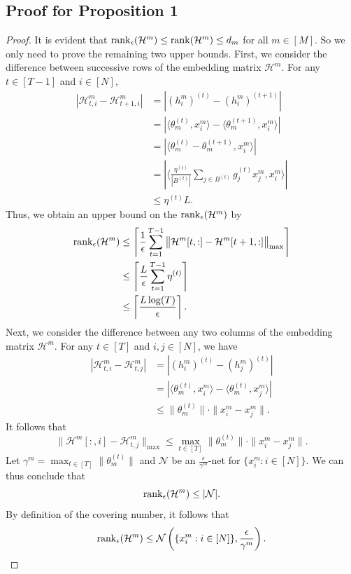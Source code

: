 \subsection{Proof for Proposition 1}
\begin{proof}
    It is evident that $\operatorname{rank}_\epsilon(\mathcal{H}^m) \leq \operatorname{rank}(\mathcal{H}^m) \leq d_m$ for all $m \in [M]$. So we only need to prove the remaining two upper bounds. First, we consider the difference between successive rows of the embedding matrix $\mathcal{H}^m$. For any $t \in [T-1]$ and $i \in [N]$, 
    \begin{align*}
        |\mathcal{H}^m_{t, i} - \mathcal{H}^m_{t+1, i}| &= |(h_i^m)^{(t)} - (h_i^m)^{(t+1)}|
        \\&= |\langle \theta_m^{(t)}, x^m_i\rangle - \langle \theta_m^{(t+1)}, x^m_i\rangle|
        \\&= |\langle \theta_m^{(t)} - \theta_m^{(t+1)}, x^m_i\rangle|
        \\&= \left|\langle \frac{\eta^{(t)}}{|B^{(t)}|}\sum_{j\in B^{(t)}} g_j^{(t)} x_j^m , x^m_i\rangle\right|
        \\&\leq \eta^{(t)}L.
    \end{align*}
    Thus, we obtain an upper bound on the $\operatorname{rank}_\epsilon(\mathcal{H}^m)$ by 
    \begin{align*}
        \operatorname{rank}_\epsilon(\mathcal{H}^m) &\leq \left\lceil \frac{1}{\epsilon} \sum_{t=1}^{T-1} \big\|\mathcal{H}^m[t,:] - \mathcal{H}^m[t+1, :]\big\|_{\max} \right\rceil \\
        &\leq \left\lceil \frac{L}{\epsilon} \sum_{t=1}^{T-1}\eta^{(t)} \right\rceil\\
        &\leq \left\lceil \frac{L\log(T)}{\epsilon} \right\rceil.
    \end{align*}
    Next, we consider the difference between any two columns of the embedding matrix $\mathcal{H}^m$. For any $t \in [T]$ and $i,j\in[N]$, we have 
    \begin{align*}
        |\mathcal{H}^m_{t, i} - \mathcal{H}^m_{t, j}| &= |(h_i^m)^{(t)} - (h_j^m)^{(t)}|
        \\&= |\langle \theta_m^{(t)}, x^m_i\rangle - \langle \theta_m^{(t)}, x^m_j\rangle|
        \\&\leq \|\theta_m^{(t)}\|\cdot\|x^m_i - x^m_j\|.
    \end{align*}
    It follows that 
    \[\|\mathcal{H}^m[:,i] - \mathcal{H}^m_{t, j}\|_{\max} \leq \max_{t \in [T]}\|\theta_m^{(t)}\|\cdot\|x^m_i - x^m_j\|.\]
    Let $\gamma^m = \max_{t \in [T]}\|\theta_m^{(t)}\|$ and $\mathcal{N}$ be an $\frac{\epsilon}{\gamma^m}$-net for $\{x^m_i : i \in [N]\}$. We can thus conclude that 
    \[\operatorname{rank}_\epsilon(\mathcal{H}^m) \leq |\mathcal{N}|.\]
    By definition of the covering number, it follows that 
    \[\operatorname{rank}_{\epsilon}(\mathcal{H}^m) \leq \mathcal{N}\left(\{x^m_i: i \in [N]\}, \frac{\epsilon}{\gamma^m}\right).\]
\end{proof}

